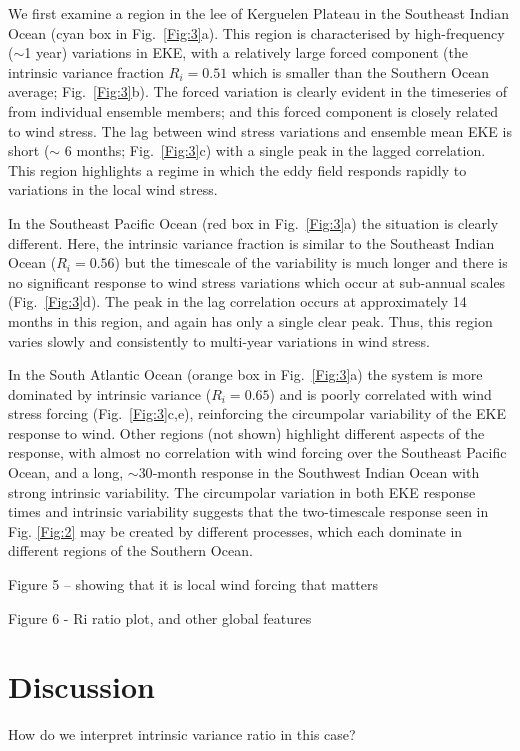 \documentclass{agujournal2019-navid}
\begin{document}
We first examine a region in the lee of Kerguelen Plateau in the Southeast Indian Ocean (cyan box in Fig.~\ref{Fig:3}a).
This region is characterised by high-frequency ($\sim$1 year) variations in EKE, with a relatively large forced component (the intrinsic variance fraction $R_i = 0.51$ which is smaller than the Southern Ocean average; Fig.~\ref{Fig:3}b).
The forced variation is clearly evident in the timeseries of from individual ensemble members; and this forced component is closely related to wind stress.
The lag between wind stress variations and ensemble mean EKE is short ($\sim$ 6 months; Fig.~\ref{Fig:3}c) with a single peak in the lagged correlation.
This region highlights a regime in which the eddy field responds rapidly to variations in the local wind stress.

In the Southeast Pacific Ocean (red box in Fig.~\ref{Fig:3}a) the situation is clearly different.
Here, the intrinsic variance fraction is similar to the Southeast Indian Ocean ($R_i=0.56$) but the timescale of the variability is much longer and there is no significant response to wind stress variations which occur at sub-annual scales (Fig.~\ref{Fig:3}d).
The peak in the lag correlation occurs at approximately 14 months in this region, and again has only a single clear peak.
Thus, this region varies slowly and consistently to multi-year variations in wind stress.

In the South Atlantic Ocean (orange box in Fig.~\ref{Fig:3}a) the system is more dominated by intrinsic variance ($R_i=0.65$) and is poorly correlated with wind stress forcing (Fig.~\ref{Fig:3}c,e), reinforcing the circumpolar variability of the EKE response to wind.
Other regions (not shown) highlight different aspects of the response, with almost no correlation with wind forcing over the Southeast Pacific Ocean, and a long, $\sim30$-month response in the Southwest Indian Ocean with strong intrinsic variability.
The circumpolar variation in both EKE response times and intrinsic variability suggests that the two-timescale response seen in Fig. \ref{Fig:2} may be created by different processes, which each dominate in different regions of the Southern Ocean.




Figure 5 -- showing that it is local wind forcing that matters

Figure 6 - Ri ratio plot, and other global features

\section{Discussion}
How do we interpret intrinsic variance ratio in this case?
\end{document}

